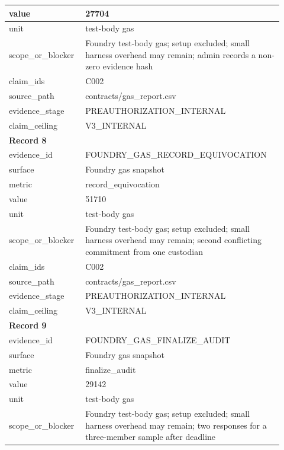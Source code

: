 \begin{longtable}{|p{0.24\linewidth}|p{0.68\linewidth}|}
value & 27704 \\ \hline
unit & test-body gas \\ \hline
scope\_\allowbreak{}or\_\allowbreak{}blocker & Foundry test-body gas;\allowbreak{} setup excluded;\allowbreak{} small harness overhead may remain;\allowbreak{} admin records a non-zero evidence hash \\ \hline
claim\_\allowbreak{}ids & C002 \\ \hline
source\_\allowbreak{}path & contracts/gas\_\allowbreak{}report.csv \\ \hline
evidence\_\allowbreak{}stage & PREAUTHORIZATION\_\allowbreak{}INTERNAL \\ \hline
claim\_\allowbreak{}ceiling & V3\_\allowbreak{}INTERNAL \\ \hline
\multicolumn{2}{|l|}{\textbf{Record 8}} \\ \hline
evidence\_\allowbreak{}id & FOUNDRY\_\allowbreak{}GAS\_\allowbreak{}RECORD\_\allowbreak{}EQUIVOCATION \\ \hline
surface & Foundry gas snapshot \\ \hline
metric & record\_\allowbreak{}equivocation \\ \hline
value & 51710 \\ \hline
unit & test-body gas \\ \hline
scope\_\allowbreak{}or\_\allowbreak{}blocker & Foundry test-body gas;\allowbreak{} setup excluded;\allowbreak{} small harness overhead may remain;\allowbreak{} second conflicting commitment from one custodian \\ \hline
claim\_\allowbreak{}ids & C002 \\ \hline
source\_\allowbreak{}path & contracts/gas\_\allowbreak{}report.csv \\ \hline
evidence\_\allowbreak{}stage & PREAUTHORIZATION\_\allowbreak{}INTERNAL \\ \hline
claim\_\allowbreak{}ceiling & V3\_\allowbreak{}INTERNAL \\ \hline
\multicolumn{2}{|l|}{\textbf{Record 9}} \\ \hline
evidence\_\allowbreak{}id & FOUNDRY\_\allowbreak{}GAS\_\allowbreak{}FINALIZE\_\allowbreak{}AUDIT \\ \hline
surface & Foundry gas snapshot \\ \hline
metric & finalize\_\allowbreak{}audit \\ \hline
value & 29142 \\ \hline
unit & test-body gas \\ \hline
scope\_\allowbreak{}or\_\allowbreak{}blocker & Foundry test-body gas;\allowbreak{} setup excluded;\allowbreak{} small harness overhead may remain;\allowbreak{} two responses for a three-member sample after deadline \\ \hline

\end{longtable}
